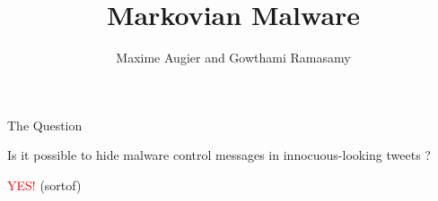 \documentclass{beamer}
\title{Markovian Malware}
\author{Maxime Augier and Gowthami Ramasamy}
\newcommand{\red}[1]{\textcolor{red}{#1}}
\begin{document}
\frame{\titlepage}

\begin{frame}{The Question}

Is it possible to hide malware control messages in innocuous-looking tweets ?

\pause
\centering
\red{YES!}
\pause
(sortof)

\end{frame}
\end{document}
